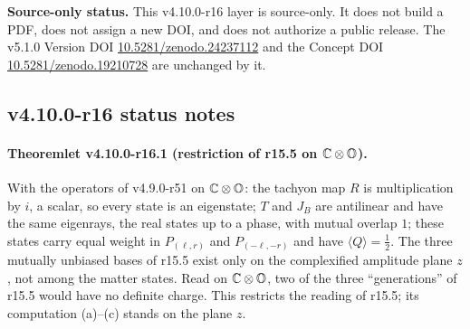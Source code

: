 \noindent\textbf{Source-only status.}
This v4.10.0-r16 layer is source-only.  It does not build a PDF, does not assign a new DOI,
and does not authorize a public release.  The v5.1.0 Version DOI
\href{https://doi.org/10.5281/zenodo.24237112}{10.5281/zenodo.24237112} and the Concept DOI
\href{https://doi.org/10.5281/zenodo.19210728}{10.5281/zenodo.19210728} are unchanged by it.

\subsection*{v4.10.0-r16 status notes}
\label{subsec:v4100-r16-status}

\paragraph{Theoremlet v4.10.0-r16.1 (restriction of r15.5 on \(\mathbb C\otimes\mathbb{O}\)).}
With the operators of v4.9.0-r51 on \(\mathbb C\otimes\mathbb{O}\): the tachyon map \(R\) is multiplication by \(i\), a scalar, so every
state is an eigenstate; \(T\) and \(J_B\) are antilinear and have the same eigenrays, the real states up to a phase, with mutual
overlap \(1\); these states carry equal weight in \(P_{(\ell,r)}\) and \(P_{(-\ell,-r)}\) and have \(\langle Q\rangle=\tfrac12\).  The three
mutually unbiased bases of r15.5 exist only on the complexified amplitude plane \(z\), not among the matter states.  Read on
\(\mathbb C\otimes\mathbb{O}\), two of the three ``generations'' of r15.5 would have no definite charge.  This restricts the reading of
r15.5; its computation (a)--(c) stands on the plane \(z\).

